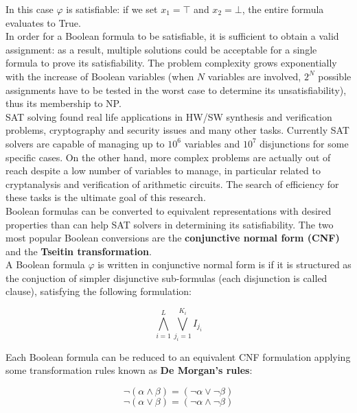 In this case $\varphi$ is satisfiable: if we set $x_1 = \top$ and $x_2 = \bot$, the entire formula evaluates to True. \\
In order for a Boolean formula to be satisfiable, it is sufficient to obtain a valid assignment: as a result, multiple solutions could be acceptable for a single formula to prove its satisfiability. The problem complexity grows exponentially with the increase of Boolean variables (when $N$ variables are involved, $2^N$ possible assignments have to be tested in the worst case to determine its unsatisfiability), thus its membership to NP. \\
SAT solving found real life applications in HW/SW synthesis and verification problems\cite{satsynth}, cryptography \cite{crypto} and security issues \cite{satsec} and many other tasks. Currently SAT solvers are capable of managing up to $10^6$ variables and $10^7$ disjunctions for some specific cases. On the other hand, more complex problems are actually out of reach despite a low number of variables to manage, in particular related to cryptanalysis and verification of arithmetic circuits. The search of efficiency for these tasks is the ultimate goal of this research. \\
Boolean formulas can be converted to equivalent representations with desired properties than can help SAT solvers in determining its satisfiability. The two most popular Boolean conversions are the \textbf{conjunctive normal form (CNF)} and the \textbf{Tseitin transformation}. \\
A Boolean formula $\varphi$ is written in conjunctive normal form is if it is structured as the conjuction of simpler disjunctive sub-formulas (each disjunction is called clause), satisfying the following formulation:

\begin{equation}
    \bigwedge_{i=1}^L \bigvee_{j_i=1}^{K_i} I_{j_i}
\end{equation}

Each Boolean formula can be reduced to an equivalent CNF formulation applying some transformation rules known as \textbf{De Morgan's rules}:

\begin{equation}
    \neg (\alpha \wedge \beta) = (\neg \alpha \vee \neg \beta)
\end{equation}
\begin{equation}
    \neg (\alpha \vee \beta) = (\neg \alpha \wedge \neg \beta)
\end{equation}

